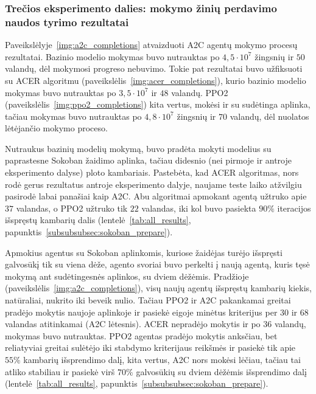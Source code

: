\documentclass{VUMIFPSbakalaurinis}
\begin{document}
\subsubsection{Trečios eksperimento dalies: mokymo žinių perdavimo naudos tyrimo rezultatai}
{
	Paveikslėlyje~\ref{img:a2c_completions} atvaizduoti A2C agentų mokymo procesų rezultatai. Bazinio modelio mokymas buvo nutrauktas po \(4,5 \cdot 10^7\) žingsnių ir \(50\) valandų, dėl mokymosi progreso nebuvimo. Tokie pat rezultatai buvo užfiksuoti su ACER algoritmu (paveikslėlis~\ref{img:acer_completions}), kurio bazinio modelio mokymas buvo nutrauktas po \(3,5 \cdot 10^7\) ir \(48\) valandų. PPO2 (paveikslėlis~\ref{img:ppo2_completions}) kita vertus, mokėsi ir su sudėtinga aplinka, tačiau mokymas buvo nutrauktas po \(4,8 \cdot 10^7\) žingsnių ir \(70\) valandų, dėl nuolatos lėtėjančio mokymo proceso.\par
	
	Nutraukus bazinių modelių mokymą, buvo pradėta mokyti modelius su paprastesne Sokoban žaidimo aplinka, tačiau didesnio (nei pirmoje ir antroje eksperimento dalyse) ploto kambariais. Pastebėta, kad ACER algoritmas, nors rodė gerus rezultatus antroje eksperimento dalyje, naujame teste laiko atžvilgiu pasirodė labai panašiai kaip A2C. Abu algoritmai apmokant agentą užtruko apie \(37\) valandas, o PPO2 užtruko tik \(22\) valandas, iki kol buvo pasiekta \(90\%\) iteracijos išspręstų kambarių dalis (lentelė~\ref{tab:all_results}, papunktis~\ref{subsubsubsec:sokoban_prepare}).\par
	
	Apmokius agentus su Sokoban aplinkomis, kuriose žaidėjas turėjo išspręsti galvosūkį tik su viena dėže, agento svoriai buvo perkelti į naują agentą, kuris tęsė mokymą ant sudėtingesnės aplinkos, su dviem dėžėmis. Pradžioje (paveikslėlis~\ref{img:a2c_completions}), visų naujų agentų išspręstų kambarių kiekis, natūraliai, nukrito iki beveik nulio. Tačiau PPO2 ir A2C pakankamai greitai pradėjo mokytis naujoje aplinkoje ir pasiekė eigoje minėtus kriterijus per \(30\) ir \(68\) valandas atitinkamai (A2C lėtesnis). ACER nepradėjo mokytis ir po \(36\) valandų, mokymas buvo nutrauktas. PPO2 agentas pradėjo mokytis anksčiau, bet reliatyviai greitai sulėtėjo iki stabdymo kriterijaus reikšmės ir pasiekė tik apie \(55\%\) kambarių išsprendimo dalį, kita vertus, A2C nors mokėsi lėčiau, tačiau tai atliko stabiliau ir pasiekė virš \(70\%\) galvosūkių su dviem dėžėmis išsprendimo dalį (lentelė~\ref{tab:all_results}, papunktis~\ref{subsubsubsec:sokoban_prepare}).
	
}
\end{document}
